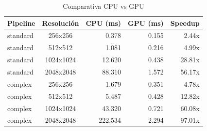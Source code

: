 \begin{table}[htbp]
\centering
\renewcommand{\arraystretch}{1.2}
\setlength{\tabcolsep}{8pt}
\begin{tabular}{|l|c|r|r|r|}
\hline
\rowcolor[gray]{0.90}
\textbf{Pipeline} & \textbf{Resolución} & \textbf{CPU (ms)} & \textbf{GPU (ms)} & \textbf{Speedup} \\
\hline
standard & 256x256 & 0.378 & 0.155 & 2.44x \\
\hline
standard & 512x512 & 1.081 & 0.216 & 4.99x \\
\hline
standard & 1024x1024 & 12.620 & 0.438 & 28.81x \\
\hline
standard & 2048x2048 & 88.310 & 1.572 & 56.17x \\
\hline
complex & 256x256 & 1.679 & 0.351 & 4.78x \\
\hline
complex & 512x512 & 5.487 & 0.428 & 12.82x \\
\hline
complex & 1024x1024 & 43.320 & 0.721 & 60.08x \\
\hline
complex & 2048x2048 & 222.534 & 2.294 & 97.01x \\
\hline
\end{tabular}
\caption{Comparativa CPU vs GPU}
\label{tab:cpu_gpu_equipo1_float32_latency}
\end{table}
